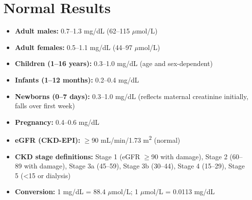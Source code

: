 \section*{Normal Results}
\begin{itemize}
  \item \textbf{Adult males:} 0.7--1.3 mg/dL (62--115 $\mu$mol/L)
  \item \textbf{Adult females:} 0.5--1.1 mg/dL (44--97 $\mu$mol/L)
  \item \textbf{Children (1--16 years):} 0.3--1.0 mg/dL (age and sex-dependent)
  \item \textbf{Infants (1--12 months):} 0.2--0.4 mg/dL
  \item \textbf{Newborns (0--7 days):} 0.3--1.0 mg/dL (reflects maternal creatinine initially, falls over first week)
  \item \textbf{Pregnancy:} 0.4--0.6 mg/dL
  \item \textbf{eGFR (CKD-EPI):} $\geq$90 mL/min/1.73 m\textsuperscript{2} (normal)
  \item \textbf{CKD stage definitions:} Stage 1 (eGFR $\geq$90 with damage), Stage 2 (60--89 with damage), Stage 3a (45--59), Stage 3b (30--44), Stage 4 (15--29), Stage 5 (<15 or dialysis)
  \item \textbf{Conversion:} 1 mg/dL = 88.4 $\mu$mol/L; 1 $\mu$mol/L = 0.0113 mg/dL
\end{itemize}

